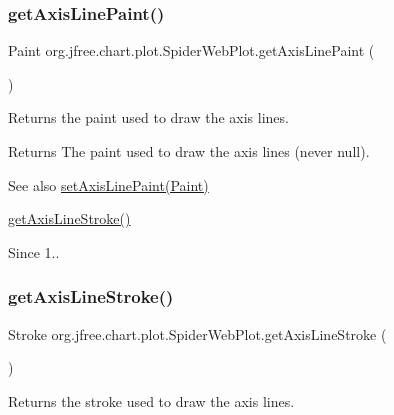 \subsubsection{\texorpdfstring{get\+Axis\+Line\+Paint()}{getAxisLinePaint()}}
{\footnotesize\ttfamily Paint org.\+jfree.\+chart.\+plot.\+Spider\+Web\+Plot.\+get\+Axis\+Line\+Paint (\begin{DoxyParamCaption}{ }\end{DoxyParamCaption})}

Returns the paint used to draw the axis lines.

\begin{DoxyReturn}{Returns}
The paint used to draw the axis lines (never {\ttfamily null}).
\end{DoxyReturn}
\begin{DoxySeeAlso}{See also}
\mbox{\hyperlink{classorg_1_1jfree_1_1chart_1_1plot_1_1_spider_web_plot_a9cb56a1a5989adca77738f49e7d387d9}{set\+Axis\+Line\+Paint(\+Paint)}} 

\mbox{\hyperlink{classorg_1_1jfree_1_1chart_1_1plot_1_1_spider_web_plot_a18a070016d28ddeeff19529dbb1ca0eb}{get\+Axis\+Line\+Stroke()}} 
\end{DoxySeeAlso}
\begin{DoxySince}{Since}
1.. 
\end{DoxySince}
\mbox{\label{classorg_1_1jfree_1_1chart_1_1plot_1_1_spider_web_plot_a18a070016d28ddeeff19529dbb1ca0eb}} 
\subsubsection{\texorpdfstring{get\+Axis\+Line\+Stroke()}{getAxisLineStroke()}}
{\footnotesize\ttfamily Stroke org.\+jfree.\+chart.\+plot.\+Spider\+Web\+Plot.\+get\+Axis\+Line\+Stroke (\begin{DoxyParamCaption}{ }\end{DoxyParamCaption})}

Returns the stroke used to draw the axis lines.

